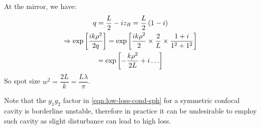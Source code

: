 \begin{parts}
	At the mirror, we have:
	\begin{gather*}
		q = \frac{L}{2} - iz_R = \frac{L}{2}\left(1-i\right) \\
		\Rightarrow \exp\left[\frac{ik\rho^2}{2q}\right] = \exp\left[\frac{ik\rho^2}{2}\times\frac{2}{L}\times\frac{1+i}{1^2+1^2}\right] \\
		= \exp\left[-\frac{k\rho^2}{2L} + i\ldots\right]
	\end{gather*}
	So spot size $w^2 = \dfrac{2L}{k} = \dfrac{L\lambda}{\pi}$.
	
	Note that the $g_1 g_2$ factor in \eqref{eqn:low-loss-cond-sph} for a symmetric confocal cavity is borderline unstable, therefore in practice it can be undesirable to employ such cavity as slight disturbance can lead to high loss.
\end{parts}